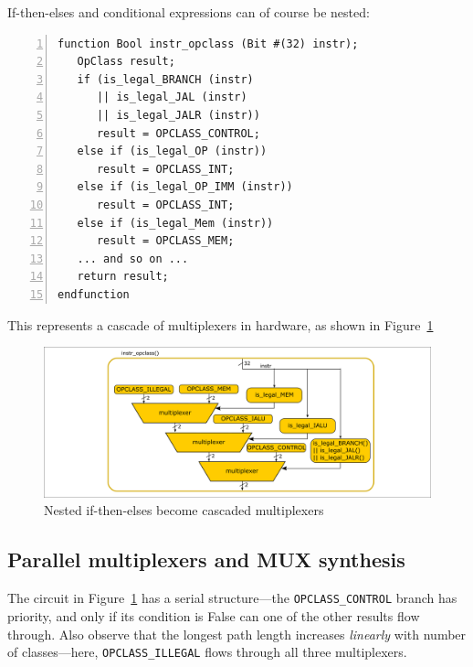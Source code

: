If-then-elses and conditional expressions can of course be nested:


{\small
\begin{Verbatim}[frame=single, numbers=left]
function Bool instr_opclass (Bit #(32) instr);
   OpClass result;
   if (is_legal_BRANCH (instr)
      || is_legal_JAL (instr)
      || is_legal_JALR (instr))
      result = OPCLASS_CONTROL;
   else if (is_legal_OP (instr))
      result = OPCLASS_INT;
   else if (is_legal_OP_IMM (instr))
      result = OPCLASS_INT;
   else if (is_legal_Mem (instr))
      result = OPCLASS_MEM;
   ... and so on ...
   return result;
endfunction
\end{Verbatim}
}

This represents a cascade of multiplexers in hardware, as shown in
Figure~\ref{Fig_Combo_Multiplexer_Cascade}
\begin{figure}[htbp]
  \centerline{\includegraphics[width=6in,angle=0]{Figures/Fig_Combo_Multiplexer_Cascade}}
  \caption{\label{Fig_Combo_Multiplexer_Cascade}Nested if-then-elses become cascaded multiplexers}
\end{figure}


\subsection{Parallel multiplexers and MUX synthesis}

\label{Sec_MUXes}


The circuit in Figure~\ref{Fig_Combo_Multiplexer_Cascade} has a
serial structure---the \verb|OPCLASS_CONTROL| branch has priority, and
only if its condition is False can one of the other results flow
through.  Also observe that the longest path length increases
\emph{linearly} with number of classes---here, \verb|OPCLASS_ILLEGAL|
flows through all three multiplexers.

